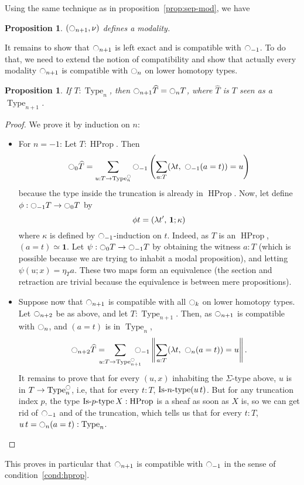 \documentclass[preprint,9pt,numbers]{sigplanconf}
\newtheorem{prop}[thm]{Proposition}
\newcommand{\ie}{i.e,\xspace}
\DeclareMathOperator{\Type}{Type}
\DeclareMathOperator{\HProp}{HProp}
\def\mymathhyphen{{\hbox{-}}}
\newcommand{\IsType}[1]
{\mathop{\mathrm{Is\mymathhyphen}#1\mathrm{\mymathhyphen type}} }
\newcommand{\modal}{\ensuremath{\ocircle}}
\newcommand \one {\mathbf{1}}
\newenvironment{mymath}[1][-0em]{%
  \newcommand\mymathaux{\vspace{#1}}%
  \vspace{#1}%
  \begin{equation*}%
  }{ %
    \mymathaux%
  \end{equation*}}
\begin{document}
Using the same technique as in proposition~\ref{prop:sep-mod}, we have
\begin{prop}
  $(\modal_{n+1},\nu)$ defines a modality.
\end{prop}

It remains to show that $\modal_{n+1}$ is left exact and is compatible
with $\modal_{-1}$. To do that, we need to extend the notion of
compatibility and show that actually every modality $\modal_{n+1}$ is
compatible with $\modal_n$ on lower homotopy types.
\begin{prop} \label{prop:compatibility}
  If $T:\Type_n$, then $\modal_{n+1} \widehat T = \modal_n T$, where $\widehat T$ is $T$ seen as a
  $\Type_{n+1}$.
\end{prop}
\begin{proof}
  We prove it by induction on $n$:
  \begin{itemize}
  \item For $n=-1$: Let $T:\HProp$. Then
    \begin{mymath}
      \modal_{0} \widehat T = \sum_{u:T \to \Type_n^\modal} \modal_{-1}\left( \sum_{a:T} 
      (\lambda t,~\modal_{-1} (a=t)) = u\right)
    \end{mymath}%
    because the type inside the truncation is already in $\HProp$.
    Now, let define $\phi : \modal_{-1} T \to \modal_0T$ by
    \begin{mymath}\phi t = (\lambda t',\, \one
      ;\kappa)\end{mymath}%
    where $\kappa$ is defined by $\modal_{-1}$-induction on
    $t$. Indeed, as $T$ is an $\HProp$, $(a=t) \simeq \one$. 
    Let $\psi : \modal_0T\to \modal_{-1} T$ by obtaining the
    witness $a:T$ (which is possible because we are trying to inhabit
    a modal proposition), and letting $\psi (u;x) = \eta_T a$.
    These two maps form an equivalence (the section and retraction are
    trivial because the equivalence is between mere propositions).
  \item Suppose now that $\modal_{n+1}$ is compatible with all $\modal_k$ on
    lower homotopy types. Let $\modal_{n+2}$ be as above, and let
    $T:\Type_{n+1}$. Then, as $\modal_{n+1}$ is compatible with $\modal_{n}$, and
    $(a=t)$ is in $\Type_n$,
    \begin{mymath}
      \modal_{n+2} \widehat T= \hspace{-1em} \sum_{u:T \to
        \Type_{n+1}^\modal} 
      \hspace{-1em} \modal_{-1}\left\| \sum_{a:T} 
        (\lambda t,~\modal_{n} (a=t)) = u\right\|.
    \end{mymath}%
    It remains to prove that for every $(u,x)$ inhabiting the
    $\Sigma$-type above, $u$ is in $T\to\Type_n^\modal$, \ie that for
    every $t:T$, $\IsType n (u\, t)$.  But for any truncation index
    $p$,
    the type $\IsType p X:\HProp$ is a sheaf as soon as $X$ is, so we can get rid
    of $\modal_{-1}$ and of the truncation, which tells us that for
    every 
    $t:T$, $u\, t = \modal_n(a=t) : \Type_n$. \qedhere
  \end{itemize}
\end{proof}
This proves in particular that $\modal_{n+1}$ is compatible with
$\modal_{-1}$ in the sense of condition~\ref{cond:hprop}.
\end{document}
